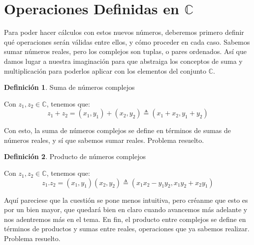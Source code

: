 \documentclass[12pt]{article}
\theoremstyle{definition}
\newtheorem{definition}{Definici\'on}[section]
\begin{document}
\section{Operaciones Definidas en $\mathbb{C}$}
 Para poder hacer c\'alculos con estos nuevos n\'umeros, deberemos primero definir qu\'e operaciones ser\'an v\'alidas entre ellos, y c\'omo proceder en cada caso. Sabemos sumar n\'umeros reales, pero los complejos son tuplas, o pares ordenados. As\'i que damos lugar a nuestra imaginaci\'on para que abstraiga los conceptos de suma y multiplicaci\'on para poderlos aplicar con los elementos del conjunto $\mathbb{C}$.\\
 
 \colorbox{red!40!white!80}{\parbox{\linewidth}{
 \theoremstyle{definition}
 \begin{definition}{Suma de n\'umeros complejos}

   Con $z_1, z_2 \in \mathbb{C}$, tenemos que:
  $$z_1 + z_2 = (x_1, y_1) + (x_2, y_2) \triangleq (x_1+x_2 , y_1+y_2)$$ 
 
 \end{definition}}}
 \linebreak
 
 Con esto, la suma de n\'umeros complejos se define en t\'erminos de sumas de n\'umeros reales, y s\'i que sabemos sumar reales. Problema resuelto.\\
 
 \colorbox{red!40!white!80}{\parbox{\linewidth}{
  \theoremstyle{definition}
 \begin{definition}{Producto de n\'umeros complejos}

   Con $z_1, z_2 \in \mathbb{C}$, tenemos que:
  $$z_1.z_2 = (x_1, y_1)(x_2, y_2) \triangleq (x_1x_2 - y_1y_2 , x_1y_2 + x_2y_1)$$ 
 
 \end{definition}}}
 \linebreak
 
 Aqu\'i pareciese que la cuesti\'on se pone menos intuitiva, pero cr\'eanme que esto es por un bien mayor, que quedar\'a bien en claro cuando avancemos m\'as adelante y nos adentremos m\'as en el tema. En fin, el producto entre complejos se define en t\'erminos de productos y sumas entre reales, operaciones que ya sabemos realizar. Problema resuelto.\\
 
\end{document}
